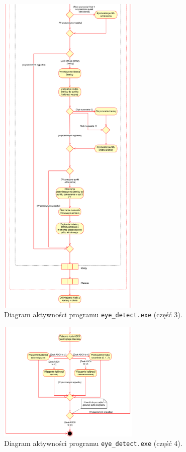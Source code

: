 \documentclass[a4paper,twoside,12pt]{book}
\begin{document}
\begin{figure}[htbp]
	\centering
	\includegraphics[width=0.6\textwidth]{pic/diagram aktywności/druga próba/diagram aktywności 3.png}
	\caption{Diagram aktywności programu \texttt{eye\-\_detect.exe} (część 3).}
	\label{fig:diagram-aktywnosci-3}
\end{figure}

\begin{figure}[htbp]
	\centering
	\includegraphics[width=0.6\textwidth]{pic/diagram aktywności/druga próba/diagram aktywności 4.png}
	\caption{Diagram aktywności programu \texttt{eye\-\_detect.exe} (część 4).}
	\label{fig:diagram-aktywnosci-4}
\end{figure}
\FloatBarrier
\end{document}
